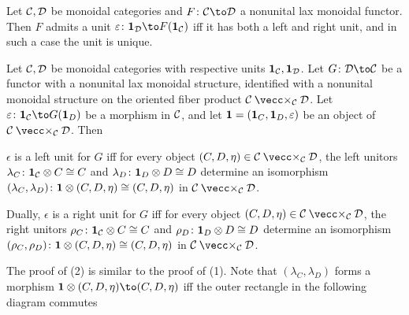 \eproof

\bcoro

    Let ${{\cal C}},{{\cal D}}$ be monoidal categories and $F\colon\C\to\D$ a nonunital lax monoidal functor.
    Then $F$ admits a unit $\epsilon\colon\1_\D\to F(\1_\C)$ iff it has both a left and right unit, and in such a case the unit is unique.

\ecoro

\bprop

    Let ${{\cal C}},{{\cal D}}$ be monoidal categories with respective units ${\bf1}_{{\cal C}},{\bf1}_{{\cal D}}$.
    Let $G\colon\D\to\C$ be a functor with a nonunital lax monoidal structure, identified with a nonunital monoidal structure on the oriented fiber product $\C\ortimes_\C\D$.
    Let $\epsilon\colon\1_\C\to G(\1_D)$ be a morphism in ${{\cal C}}$, and let ${\bf1}=({\bf1}_C,{\bf1}_D,\varepsilon)$ be an object of $\C\ortimes_\C\D$.
    Then
    \benum
        \item $\epsilon$ is a left unit for $G$ iff for every object $(C,D,\eta)\in\C\ortimes_\C\D$, the left unitors $\lambda_C\colon{\bf1}_{{\cal C}}\otimes C\cong C$ and $\lambda_D\colon{\bf1}_D\otimes D\cong D$
        determine an isomorphism $(\lambda_C,\lambda_D)\colon{\bf1}\otimes(C,D,\eta)\cong(C,D,\eta)$ in $\C\ortimes_\C\D$.
        \item Dually, $\epsilon$ is a right unit for $G$ iff for every object $(C,D,\eta)\in\C\ortimes_\C\D$, the right unitors $\rho_C\colon{\bf1}_{{\cal C}}\otimes C\cong C$ and $\rho_D\colon{\bf1}_D\otimes D\cong D$
        determine an isomorphism $(\rho_C,\rho_D)\colon{\bf1}\otimes(C,D,\eta)\cong(C,D,\eta)$ in $\C\ortimes_\C\D$.
    \eenum

\eprop

\bproof

    The proof of (2) is similar to the proof of (1).
    Note that $(\lambda_C,\lambda_D)$ forms a morphism $\1\otimes(C,D,\eta)\to(C,D,\eta)$ iff the outer rectangle in the following diagram commutes



